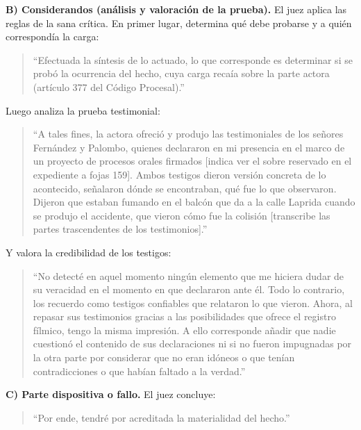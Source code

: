 \documentclass[12pt,oneside]{book}
\begin{document}
\textbf{B) Considerandos (análisis y valoración de la prueba).} El juez aplica las reglas de la sana crítica. En primer lugar, determina qué debe probarse y a quién correspondía la carga:

\begin{quote}
``Efectuada la síntesis de lo actuado, lo que corresponde es determinar si se probó la ocurrencia del hecho, cuya carga recaía sobre la parte actora (artículo 377 del Código Procesal).''
\end{quote}

Luego analiza la prueba testimonial:

\begin{quote}
``A tales fines, la actora ofreció y produjo las testimoniales de los señores Fernández y Palombo, quienes declararon en mi presencia en el marco de un proyecto de procesos orales firmados [indica ver el sobre reservado en el expediente a fojas 159]. Ambos testigos dieron versión concreta de lo acontecido, señalaron dónde se encontraban, qué fue lo que observaron. Dijeron que estaban fumando en el balcón que da a la calle Laprida cuando se produjo el accidente, que vieron cómo fue la colisión [transcribe las partes trascendentes de los testimonios].''
\end{quote}

Y valora la credibilidad de los testigos:

\begin{quote}
``No detecté en aquel momento ningún elemento que me hiciera dudar de su veracidad en el momento en que declararon ante él. Todo lo contrario, los recuerdo como testigos confiables que relataron lo que vieron. Ahora, al repasar sus testimonios gracias a las posibilidades que ofrece el registro fílmico, tengo la misma impresión. A ello corresponde añadir que nadie cuestionó el contenido de sus declaraciones ni si no fueron impugnadas por la otra parte por considerar que no eran idóneos o que tenían contradicciones o que habían faltado a la verdad.''
\end{quote}

\textbf{C) Parte dispositiva o fallo.} El juez concluye:

\begin{quote}
``Por ende, tendré por acreditada la materialidad del hecho.''
\end{quote}
\end{document}
